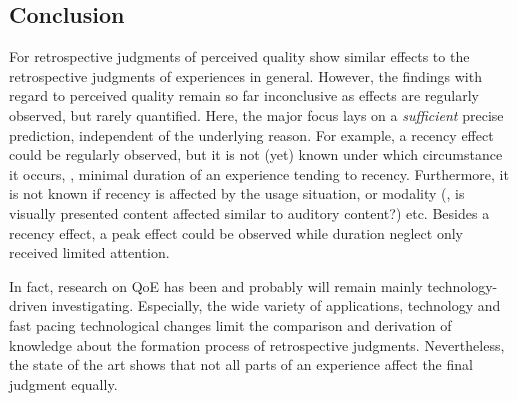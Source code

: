 \subsection{Conclusion}
For retrospective judgments of perceived quality show similar effects to the retrospective judgments of experiences in general.
However, the findings with regard to perceived quality remain so far inconclusive as effects are regularly observed, but rarely quantified.
Here, the major focus lays on a \emph{sufficient} precise prediction, independent of the underlying reason.
For example, a recency effect could be regularly observed, but it is not (yet) known under which circumstance it occurs, \eg, minimal duration of an experience tending to recency.
Furthermore, it is not known if recency is affected by the usage situation, or modality (\eg, is visually presented content affected similar to auditory content?) etc.
Besides a recency effect, a peak effect could be observed while duration neglect only received limited attention.

In fact, research on \ac{QoE} has been and probably will remain mainly technology-driven investigating.
Especially, the wide variety of applications, technology and fast pacing technological changes limit the comparison and derivation of knowledge about the formation process of retrospective judgments.
Nevertheless, the state of the art shows that not all parts of an experience affect the final judgment equally.
